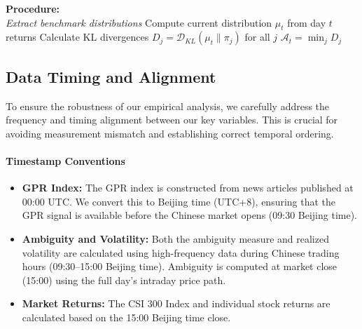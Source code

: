 \documentclass[preprint,12pt,authoryear]{elsarticle}
\begin{document}
\vspace{0.6\baselineskip}
{\color{red}
\begin{algorithm}[H]
\caption{Daily Ambiguity Calculation}
\label{alg:ambiguity}


\BlankLine
\textbf{Procedure:}\\
\emph{Extract benchmark distributions}
Compute current distribution $\mu_t$ from day $t$ returns\;
Calculate KL divergences $D_j = \mathcal{D}_{KL}(\mu_t \| \pi_j)$ for all $j$\;
\Return $\mathcal{A}_t = \min_j D_j$\;
\BlankLine
{}
\end{algorithm}
}

\subsection{Data Timing and Alignment}
To ensure the robustness of our empirical analysis, we carefully address the frequency and timing alignment between our key variables. This is crucial for avoiding measurement mismatch and establishing correct temporal ordering.

\paragraph{Timestamp Conventions}
\begin{itemize}
    \item \textbf{GPR Index:} The GPR index is constructed from news articles published at 00:00 UTC. We convert this to Beijing time (UTC+8), ensuring that the GPR signal is available before the Chinese market opens (09:30 Beijing time).
    \item \textbf{Ambiguity and Volatility:} Both the ambiguity measure and realized volatility are calculated using high-frequency data during Chinese trading hours (09:30--15:00 Beijing time). Ambiguity is computed at market close (15:00) using the full day's intraday price path.
    \item \textbf{Market Returns:} The CSI 300 Index and individual stock returns are calculated based on the 15:00 Beijing time close.
\end{itemize}
\end{document}
